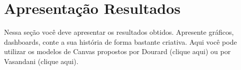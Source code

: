 \chapter{Apresentação Resultados}

Nessa seção você deve apresentar os resultados obtidos. Apresente gráficos, dashboards, conte a sua história de forma bastante criativa. Aqui você pode utilizar os modelos de Canvas propostos por Dourard (clique aqui) ou por Vasandani (clique aqui). 
 \cite{kopka1995guide}